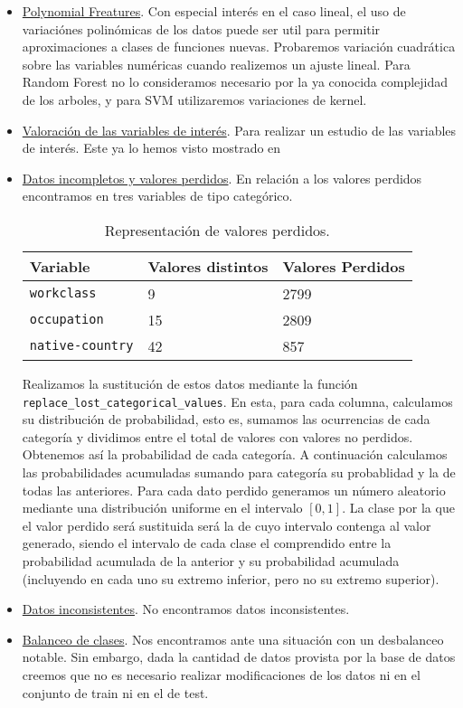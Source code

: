 \documentclass[11pt,a4paper]{article}
\begin{document}
\begin{itemize}
\item  \underline{Polynomial Freatures}. Con especial interés en el caso lineal, el uso de variaciónes polinómicas de los datos puede ser util para permitir aproximaciones a clases de funciones nuevas. Probaremos variación cuadrática sobre las variables numéricas cuando realizemos un ajuste lineal. Para Random Forest no lo consideramos necesario por la ya conocida complejidad de los arboles, y para SVM utilizaremos variaciones de kernel. \\
	
	\item \underline{Valoración de las variables de interés}. Para realizar un estudio de las variables de interés. Este ya lo hemos visto mostrado en 
	\item \underline{Datos incompletos y valores perdidos}. En relación a los valores perdidos encontramos en tres variables de tipo categórico.\\
	
\begin{table}[h]
\begin{center}
\begin{tabular}{|l|ll|}
\hline
Variable& Valores distintos & Valores Perdidos\\ \hline
\texttt{workclass} & 9 & 2799\\
\texttt{occupation} & 15 & 2809\\
\texttt{native-country} & 42 & 857\\\hline
\end{tabular}
\end{center}
\caption{Representación de valores perdidos.}
	\end{table}
	
	Realizamos la sustitución de estos datos mediante la función \texttt{replace\_lost\_categorical\_values}. En esta, para cada columna, calculamos su distribución de probabilidad, esto es, sumamos las ocurrencias de cada categoría y dividimos entre el total de valores con valores no perdidos. Obtenemos así la probabilidad de cada categoría. A continuación calculamos las probabilidades acumuladas sumando para categoría su probablidad y la de todas las anteriores. Para cada dato perdido generamos un número aleatorio mediante una distribución uniforme en el intervalo $[0,1]$. La clase por la que el valor perdido será sustituida será la de cuyo intervalo contenga al valor generado, siendo el intervalo de cada clase el comprendido entre la probabilidad acumulada de la anterior y su probabilidad acumulada (incluyendo en cada uno su extremo inferior, pero no su extremo superior).
	
	\item \underline{Datos inconsistentes}. No encontramos datos inconsistentes.
	\item \underline{Balanceo de clases}. Nos encontramos ante una situación con un desbalanceo notable. Sin embargo, dada la cantidad de datos provista por la base de datos creemos que no es necesario realizar modificaciones de los datos ni en el conjunto de train ni en el de test.
\end{itemize}
\end{document}
